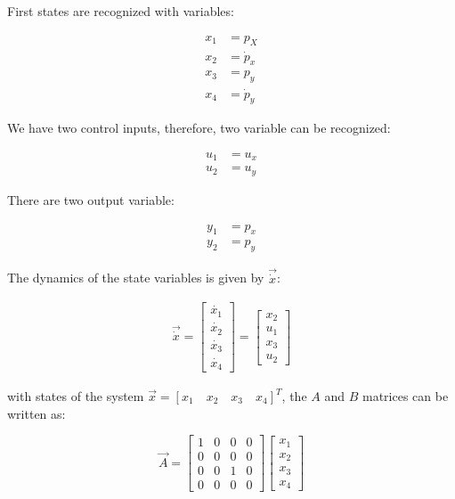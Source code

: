 First states are recognized with variables:

\begin{align*}
	x_1 &= p_X \\
	x_2 &= \dot{p}_{x} \\
	x_3 &= p_y \\
	x_4 &= \dot{p}_{y}
\end{align*}

We have two control inputs, therefore, two variable can be recognized:

\begin{align*}
	u_1 &= u_x \\
	u_2 &= u_y
\end{align*}

There are two output variable:

\begin{align*}
	y_1 &= p_x \\
	y_2 &= p_y
\end{align*}

The dynamics of the state variables is given by $\vec{\dot{x}}$:

\begin{align*}
	\vec{\dot{x}} = \begin{bmatrix}
		\dot{x_1} \\
		\dot{x_2} \\
		\dot{x_3} \\
		\dot{x_4}
	\end{bmatrix} = \begin{bmatrix}
		x_2 \\
		u_1 \\
		x_3 \\
		u_2
	\end{bmatrix}
\end{align*}

with states of the system $\vec{x} = [x_1 \quad x_2 \quad x_3 \quad x_4]^{T}$, the $A$ and $B$ matrices can be written as:

\begin{equation*}
	\vec{A} = \begin{bmatrix}
		1 &0 &0 &0 \\
		0 &0 &0 &0 \\
		0 &0 &1 &0 \\
		0 &0 &0 &0
	\end{bmatrix} \begin{bmatrix}
		x_1 \\ x_2 \\ x_3 \\ x_4
	\end{bmatrix}
\end{equation*}

